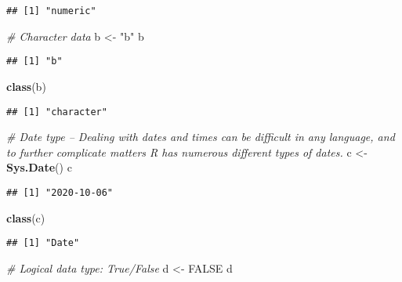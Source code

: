 \documentclass[
]{article}
\newenvironment{Shaded}{\begin{snugshade}}{\end{snugshade}}
\newcommand{\CommentTok}[1]{\textcolor[rgb]{0.56,0.35,0.01}{\textit{#1}}}
\newcommand{\KeywordTok}[1]{\textcolor[rgb]{0.13,0.29,0.53}{\textbf{#1}}}
\newcommand{\NormalTok}[1]{#1}
\newcommand{\OtherTok}[1]{\textcolor[rgb]{0.56,0.35,0.01}{#1}}
\newcommand{\StringTok}[1]{\textcolor[rgb]{0.31,0.60,0.02}{#1}}
\begin{document}
\begin{verbatim}
## [1] "numeric"
\end{verbatim}

\begin{Shaded}
\begin{Highlighting}[]
\CommentTok{# Character data}
\NormalTok{b <-}\StringTok{ "b"}
\NormalTok{b}
\end{Highlighting}
\end{Shaded}

\begin{verbatim}
## [1] "b"
\end{verbatim}

\begin{Shaded}
\begin{Highlighting}[]
\KeywordTok{class}\NormalTok{(b)}
\end{Highlighting}
\end{Shaded}

\begin{verbatim}
## [1] "character"
\end{verbatim}

\begin{Shaded}
\begin{Highlighting}[]
\CommentTok{# Date type -- Dealing with dates and times can be difficult in any language, and to further complicate matters R has numerous different types of dates. }
\NormalTok{c <-}\StringTok{ }\KeywordTok{Sys.Date}\NormalTok{()}
\NormalTok{c}
\end{Highlighting}
\end{Shaded}

\begin{verbatim}
## [1] "2020-10-06"
\end{verbatim}

\begin{Shaded}
\begin{Highlighting}[]
\KeywordTok{class}\NormalTok{(c)}
\end{Highlighting}
\end{Shaded}

\begin{verbatim}
## [1] "Date"
\end{verbatim}

\begin{Shaded}
\begin{Highlighting}[]
\CommentTok{# Logical data type: True/False}
\NormalTok{d <-}\StringTok{ }\OtherTok{FALSE}
\NormalTok{d}
\end{Highlighting}
\end{Shaded}
\end{document}

